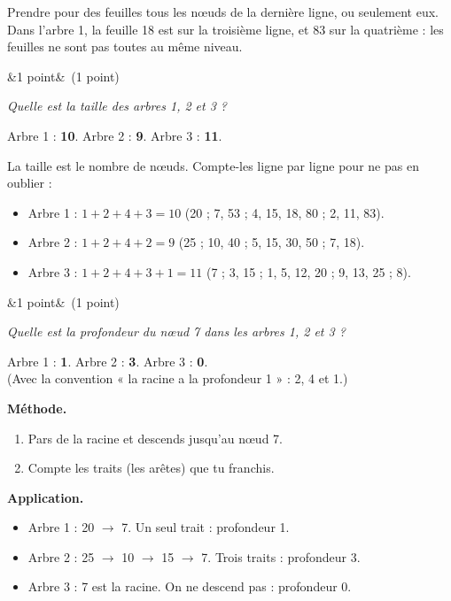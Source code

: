 \documentclass[11pt, a4paper]{exam}
\newcommand{\Q}[3]{\par\needspace{5\baselineskip}\bigskip\noindent{\large\bfseries Question #1}\ifx&#2&\else\ \textnormal{(#2)}\fi\par\nopagebreak\smallskip\noindent\textit{#3}\par\nopagebreak\smallskip}
\newcommand{\methode}{\par\noindent\textbf{Méthode.}\ }
\newcommand{\application}{\par\noindent\textbf{Application.}\ }
\begin{document}
\begin{erreur}
Prendre pour des feuilles tous les nœuds de la dernière ligne, ou seulement eux. Dans l'arbre 1, la feuille 18 est sur la troisième ligne, et 83 sur la quatrième : les feuilles ne sont pas toutes au même niveau.
\end{erreur}

\Q{3}{1 point}{Quelle est la taille des arbres 1, 2 et 3 ?}
\begin{reponse}
Arbre 1 : \textbf{10}. \qquad Arbre 2 : \textbf{9}. \qquad Arbre 3 : \textbf{11}.
\end{reponse}
La taille est le nombre de nœuds. Compte-les ligne par ligne pour ne pas en oublier :
\begin{itemize}
\item Arbre 1 : $1 + 2 + 4 + 3 = 10$ (20 ; 7, 53 ; 4, 15, 18, 80 ; 2, 11, 83).
\item Arbre 2 : $1 + 2 + 4 + 2 = 9$ (25 ; 10, 40 ; 5, 15, 30, 50 ; 7, 18).
\item Arbre 3 : $1 + 2 + 4 + 3 + 1 = 11$ (7 ; 3, 15 ; 1, 5, 12, 20 ; 9, 13, 25 ; 8).
\end{itemize}

\Q{4}{1 point}{Quelle est la profondeur du nœud 7 dans les arbres 1, 2 et 3 ?}
\begin{reponse}
Arbre 1 : \textbf{1}. \qquad Arbre 2 : \textbf{3}. \qquad Arbre 3 : \textbf{0}. \\
\small(Avec la convention « la racine a la profondeur 1 » : 2, 4 et 1.)
\end{reponse}
\methode
\begin{enumerate}
\item Pars de la racine et descends jusqu'au nœud 7.
\item Compte les traits (les arêtes) que tu franchis.
\end{enumerate}
\application
\begin{itemize}
\item Arbre 1 : 20 $\to$ 7. Un seul trait : profondeur 1.
\item Arbre 2 : 25 $\to$ 10 $\to$ 15 $\to$ 7. Trois traits : profondeur 3.
\item Arbre 3 : 7 est la racine. On ne descend pas : profondeur 0.
\end{itemize}
\end{document}
